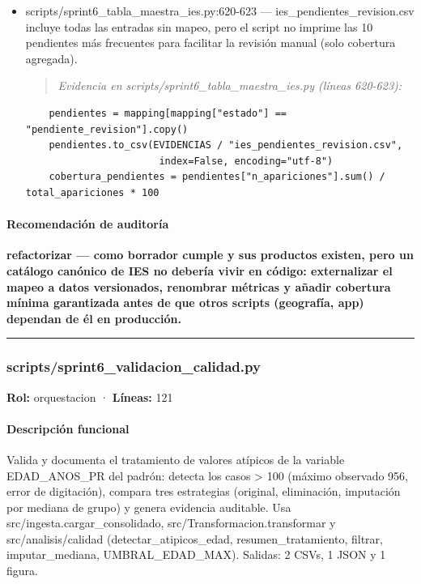 \begin{tcolorbox}[riesgo]
\begin{itemize}
  \item scripts/sprint6\_tabla\_maestra\_ies.py:620-623 --- ies\_pendientes\_revision.csv incluye todas las entradas sin mapeo, pero el script no imprime las 10 pendientes más frecuentes para facilitar la revisión manual (solo cobertura agregada).
\begin{quote}\footnotesize\ttfamily
\noindent\emph{Evidencia en scripts/sprint6\_tabla\_maestra\_ies.py (líneas 620-623):}
\end{quote}
\begin{lstlisting}
    pendientes = mapping[mapping["estado"] == "pendiente_revision"].copy()
    pendientes.to_csv(EVIDENCIAS / "ies_pendientes_revision.csv",
                       index=False, encoding="utf-8")
    cobertura_pendientes = pendientes["n_apariciones"].sum() / total_apariciones * 100
\end{lstlisting}

\end{itemize}
\end{tcolorbox}

\paragraph{Recomendación de auditoría}
\textbf{refactorizar --- como borrador cumple y sus productos existen, pero un catálogo canónico de IES no debería vivir en código: externalizar el mapeo a datos versionados, renombrar métricas y añadir cobertura mínima garantizada antes de que otros scripts (geografía, app) dependan de él en producción.}

\medskip
\hrule

\subsubsection{scripts/sprint6\_validacion\_calidad.py}
\textbf{Rol:} orquestacion · \textbf{Líneas:} 121

\paragraph{Descripción funcional}
Valida y documenta el tratamiento de valores atípicos de la variable EDAD\_ANOS\_PR del padrón: detecta los casos > 100 (máximo observado 956, error de digitación), compara tres estrategias (original, eliminación, imputación por mediana de grupo) y genera evidencia auditable. Usa src/ingesta.cargar\_consolidado, src/Transformacion.transformar y src/analisis/calidad (detectar\_atipicos\_edad, resumen\_tratamiento, filtrar, imputar\_mediana, UMBRAL\_EDAD\_MAX). Salidas: 2 CSVs, 1 JSON y 1 figura.

